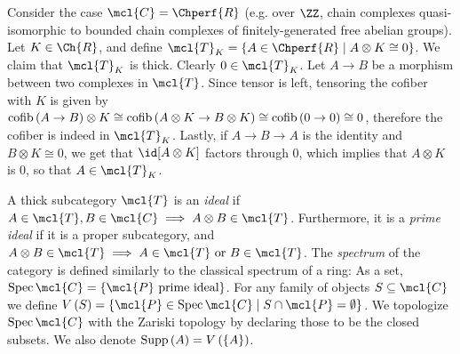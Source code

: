 \begin{example}\label{chperf-tk}
	Consider the case $\mcl{C} = \Chperf{R}$ (e.g. over $\ZZ$, chain complexes quasi-isomorphic to bounded chain complexes of finitely-generated free abelian groups).
	Let $K \in \Ch{R}$, and define
	$\mcl{T}_K = \left\{ A \in \Chperf{R} \mid A \otimes K \cong 0 \right\}$.
	We claim that $\mcl{T}_K$ is thick.
	Clearly $0 \in \mcl{T}_K$.
	Let $A \to B$ be a morphism between two complexes in $\mcl{T}$. Since tensor is left, tensoring the cofiber with $K$ is given by
	$\operatorname{cofib}\left(A \to B\right) \otimes K \cong \operatorname{cofib}\left(A \otimes K \to B \otimes K\right) \cong \operatorname{cofib}\left(0 \to 0\right) \cong 0$, therefore the cofiber is indeed in $\mcl{T}_K$.
	Lastly, if $A \to B \to A$ is the identity and $B \otimes K \cong 0$, we get that $\id[A \otimes K]$ factors through $0$, which implies that $A \otimes K$ is $0$, so that $A \in \mcl{T}_K$.
\end{example}

\begin{definition}
	A thick subcategory $\mcl{T}$ is an \emph{ideal} if $A \in \mcl{T}, B \in \mcl{C} \implies A \otimes B \in \mcl{T}$.
	Furthermore, it is a \emph{prime ideal} if it is a proper subcategory, and $A \otimes B \in \mcl{T} \implies A \in \mcl{T} \textrm{ or } B \in \mcl{T}$.
	The \emph{spectrum} of the category is defined similarly to the classical spectrum of a ring:
	As a set, $\spec \mcl{C} = \left\{ \mcl{P}\textrm{ prime ideal} \right\}$.
	For any family of objects $S \subseteq \mcl{C}$ we define $V\left(S\right) = \left\{ \mcl{P} \in \spec \mcl{C} \mid S \cap \mcl{P} = \emptyset \right\}$.
	We topologize $\spec \mcl{C}$ with the Zariski topology by declaring those to be the closed subsets.
	We also denote $\operatorname{Supp}\left(A\right) = V\left(\left\{ A \right\}\right)$.
\end{definition}

